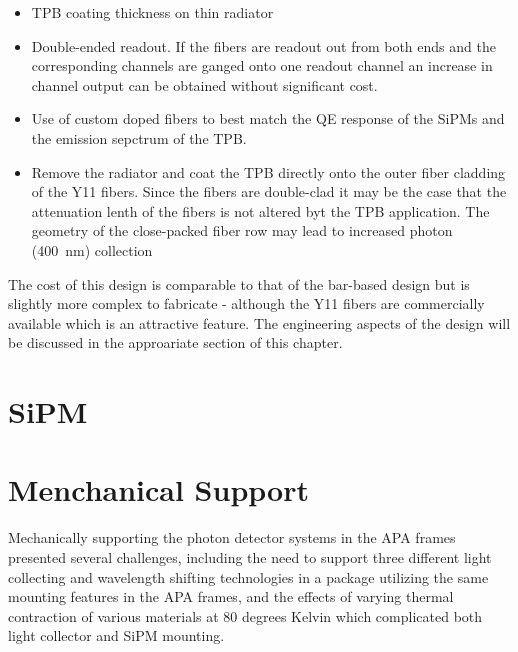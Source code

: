 \begin{itemize}

\item{TPB coating thickness on thin radiator}

\item{Double-ended readout. If the fibers are readout out from both
  ends and the corresponding channels are ganged onto one readout
  channel an increase in channel output can be obtained without
  significant cost.}

\item{Use of custom doped fibers to best match the QE response of the
  SiPMs and the emission sepctrum of the TPB.}

\item{Remove the radiator and coat the TPB directly onto the outer
  fiber cladding of the Y11 fibers. Since the fibers are double-clad
  it may be the case that the attenuation lenth of the fibers is not
  altered byt the TPB application. The geometry of the close-packed
  fiber row may lead to increased photon (400~nm) collection}

\end{itemize}

The cost of this design is comparable to that of the bar-based design
but is slightly more complex to fabricate - although the Y11 fibers
are commercially available which is an attractive feature. The
engineering aspects of the design will be discussed in the approariate
section of this chapter. 

\section{SiPM}

\section{Menchanical Support}

Mechanically supporting the photon detector systems in the APA frames
presented several challenges, including the need to support three
different light collecting and wavelength shifting technologies in a
package utilizing the same mounting features in the APA frames, and
the effects of varying thermal contraction of various materials at 80
degrees Kelvin which complicated both light collector and SiPM
mounting.

